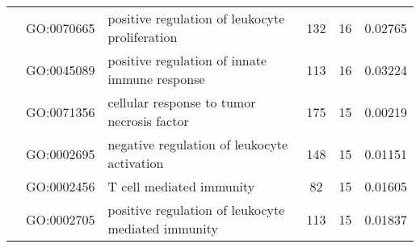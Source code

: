 \begin{landscape}
\begin{longtable}[c]{@{}lllccr@{}}
		                                               & GO:0070665                         & positive regulation of leukocyte proliferation                            & 132                                                                & 16                                                                   & 0.02765                                                                                  \\
		                                               & GO:0045089                         & positive regulation of innate immune response                             & 113                                                                & 16                                                                   & 0.03224                                                                                  \\
		                                               & GO:0071356                         & cellular response to tumor necrosis factor                                & 175                                                                & 15                                                                   & 0.00219                                                                                  \\
		                                               & GO:0002695                         & negative regulation of leukocyte activation                               & 148                                                                & 15                                                                   & 0.01151                                                                                  \\
		                                               & GO:0002456                         & T cell mediated immunity                                                  & 82                                                                 & 15                                                                   & 0.01605                                                                                  \\
		                                               & GO:0002705                         & positive regulation of leukocyte mediated immunity                        & 113                                                                & 15                                                                   & 0.01837                                                                                  \\

\end{longtable}
\end{landscape}
